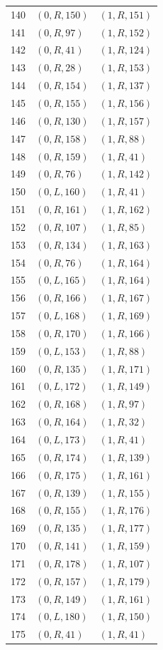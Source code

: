\begin{longtable}{@{}rll@{}}
140 & $(0,R,150)$ & $(1,R,151)$\\
141 & $(0,R,97)$ & $(1,R,152)$\\
142 & $(0,R,41)$ & $(1,R,124)$\\
143 & $(0,R,28)$ & $(1,R,153)$\\
144 & $(0,R,154)$ & $(1,R,137)$\\
145 & $(0,R,155)$ & $(1,R,156)$\\
146 & $(0,R,130)$ & $(1,R,157)$\\
147 & $(0,R,158)$ & $(1,R,88)$\\
148 & $(0,R,159)$ & $(1,R,41)$\\
149 & $(0,R,76)$ & $(1,R,142)$\\
150 & $(0,L,160)$ & $(1,R,41)$\\
151 & $(0,R,161)$ & $(1,R,162)$\\
152 & $(0,R,107)$ & $(1,R,85)$\\
153 & $(0,R,134)$ & $(1,R,163)$\\
154 & $(0,R,76)$ & $(1,R,164)$\\
155 & $(0,L,165)$ & $(1,R,164)$\\
156 & $(0,R,166)$ & $(1,R,167)$\\
157 & $(0,L,168)$ & $(1,R,169)$\\
158 & $(0,R,170)$ & $(1,R,166)$\\
159 & $(0,L,153)$ & $(1,R,88)$\\
160 & $(0,R,135)$ & $(1,R,171)$\\
161 & $(0,L,172)$ & $(1,R,149)$\\
162 & $(0,R,168)$ & $(1,R,97)$\\
163 & $(0,R,164)$ & $(1,R,32)$\\
164 & $(0,L,173)$ & $(1,R,41)$\\
165 & $(0,R,174)$ & $(1,R,139)$\\
166 & $(0,R,175)$ & $(1,R,161)$\\
167 & $(0,R,139)$ & $(1,R,155)$\\
168 & $(0,R,155)$ & $(1,R,176)$\\
169 & $(0,R,135)$ & $(1,R,177)$\\
170 & $(0,R,141)$ & $(1,R,159)$\\
171 & $(0,R,178)$ & $(1,R,107)$\\
172 & $(0,R,157)$ & $(1,R,179)$\\
173 & $(0,R,149)$ & $(1,R,161)$\\
174 & $(0,L,180)$ & $(1,R,150)$\\
175 & $(0,R,41)$ & $(1,R,41)$\\

\end{longtable}
